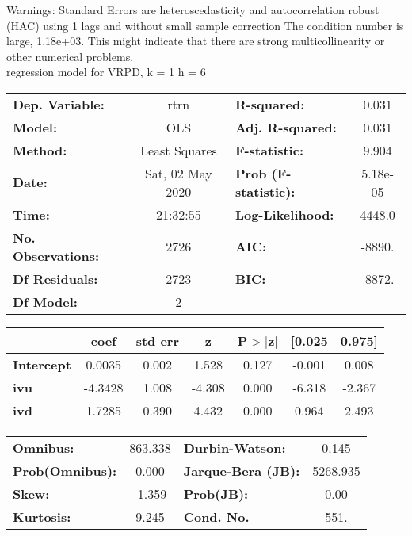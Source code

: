 Warnings: \newline
 [1] Standard Errors are heteroscedasticity and autocorrelation robust (HAC) using 1 lags and without small sample correction \newline
 [2] The condition number is large, 1.18e+03. This might indicate that there are \newline
 strong multicollinearity or other numerical problems.\\ 

regression model for VRPD, k = 1 h = 6\begin{center}
\begin{tabular}{lclc}
\toprule
\textbf{Dep. Variable:}    &       rtrn       & \textbf{  R-squared:         } &     0.031   \\
\textbf{Model:}            &       OLS        & \textbf{  Adj. R-squared:    } &     0.031   \\
\textbf{Method:}           &  Least Squares   & \textbf{  F-statistic:       } &     9.904   \\
\textbf{Date:}             & Sat, 02 May 2020 & \textbf{  Prob (F-statistic):} &  5.18e-05   \\
\textbf{Time:}             &     21:32:55     & \textbf{  Log-Likelihood:    } &    4448.0   \\
\textbf{No. Observations:} &        2726      & \textbf{  AIC:               } &    -8890.   \\
\textbf{Df Residuals:}     &        2723      & \textbf{  BIC:               } &    -8872.   \\
\textbf{Df Model:}         &           2      & \textbf{                     } &             \\
\bottomrule
\end{tabular}
\begin{tabular}{lcccccc}
                   & \textbf{coef} & \textbf{std err} & \textbf{z} & \textbf{P$> |$z$|$} & \textbf{[0.025} & \textbf{0.975]}  \\
\midrule
\textbf{Intercept} &       0.0035  &        0.002     &     1.528  &         0.127        &       -0.001    &        0.008     \\
\textbf{ivu}       &      -4.3428  &        1.008     &    -4.308  &         0.000        &       -6.318    &       -2.367     \\
\textbf{ivd}       &       1.7285  &        0.390     &     4.432  &         0.000        &        0.964    &        2.493     \\
\bottomrule
\end{tabular}
\begin{tabular}{lclc}
\textbf{Omnibus:}       & 863.338 & \textbf{  Durbin-Watson:     } &    0.145  \\
\textbf{Prob(Omnibus):} &   0.000 & \textbf{  Jarque-Bera (JB):  } & 5268.935  \\
\textbf{Skew:}          &  -1.359 & \textbf{  Prob(JB):          } &     0.00  \\
\textbf{Kurtosis:}      &   9.245 & \textbf{  Cond. No.          } &     551.  \\
\bottomrule
\end{tabular}
\end{center}

